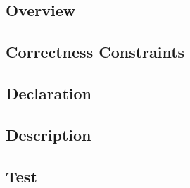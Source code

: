 \documentclass{article}
\begin{document}
\subsection{Overview}
\subsection{Correctness Constraints}
\subsection{Declaration}
\subsection{Description}
\subsection{Test}
\end{document}
